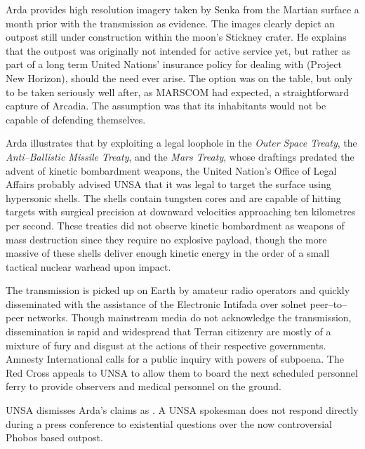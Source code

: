 Arda provides high resolution imagery taken by Senka from the Martian surface a month prior with the transmission as evidence. The images clearly depict an outpost still under construction within the moon's Stickney crater. He explains that the outpost was originally not intended for active service yet, but rather as part of a long term United Nations' insurance policy for dealing with  (Project New Horizon), should the need ever arise. The option was on the table, but only to be taken seriously well after, as MARSCOM had expected, a straightforward capture of Arcadia. The assumption was that its inhabitants would not be capable of defending themselves.

Arda illustrates that by exploiting a legal loophole in the {\it Outer Space Treaty}, the {\it Anti--Ballistic Missile Treaty}, and the {\it Mars Treaty}, whose draftings predated the advent of kinetic bombardment weapons, the United Nation's Office of Legal Affairs probably advised UNSA that it was legal to target the surface using hypersonic shells. The shells contain tungsten cores and are capable of hitting targets with surgical precision at downward velocities approaching ten kilometres per second. These treaties did not observe kinetic bombardment as weapons of mass destruction since they require no explosive payload, though the more massive of these shells deliver enough kinetic energy in the order of a small tactical nuclear warhead upon impact.

The transmission is picked up on Earth by amateur radio operators and quickly disseminated with the assistance of the Electronic Intifada over solnet peer--to--peer networks. Though mainstream media do not acknowledge the transmission, dissemination is rapid and widespread that Terran citizenry are mostly of a mixture of fury and disgust at the actions of their respective governments. Amnesty International calls for a public inquiry with powers of subpoena. The Red Cross appeals to UNSA to allow them to board the next scheduled personnel ferry to provide observers and medical personnel on the ground.

UNSA dismisses Arda's claims as . A UNSA spokesman does not respond directly during a press conference to existential questions over the now controversial Phobos based outpost.

